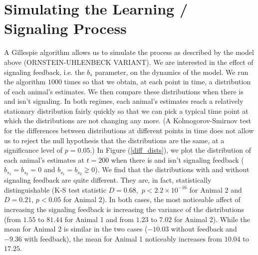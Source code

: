 \documentclass{article}
\begin{document}
\section{Simulating the Learning / Signaling Process }
A Gillespie algorithm allows us to simulate the process as described by the model above (ORNSTEIN-UHLENBECK VARIANT).  We are interested in the effect of signaling feedback, i.e. the $b_s$ parameter, on the dynamics of the model.  We run the algorithm $1000$ times so that we obtain, at each point in time, a distribution of each animal's estimates.  We then compare these distributions when there is and isn't signaling.  In both regimes, each animal's estimates reach a relatively stationary distribution fairly quickly so that we can pick a typical time point at which the distributions are not changing any more.  (A Kolmogorov-Smirnov test for the differences between distributions at different points in time does not allow us to reject the null hypothesis that the distributions are the same, at a significance level of $p=0.05$.)  In Figure (\ref{diff_dists}), we plot the distribution of each animal's estimates at $t=200$ when there is and isn't signaling feedback ($b_{s_1}=b_{s_2}=0$ and $b_{s_1}=b_{s_2}\gneq 0$).  We find that the distributions with and without signaling feedback are quite different.   They are, in fact, statistically distinguishable (K-S test statistic $D=0.68,$ $p<2.2\times 10^{-16}$ for Animal 2 and $D=0.21$, $p<0.05$ for Animal 2).  In both cases, the most noticeable affect of increasing the signaling feedback is increasing the variance of the distributions (from $1.55$ to $81.44$ for Animal 1 and from $1.23$ to $7.02$ for Animal 2).  While the mean for Animal 2 is similar in the two cases ($-10.03$ without feedback and $-9.36$ with feedback), the mean for Animal 1 noticeably increases from $10.04$ to $17.25$.
\end{document}
